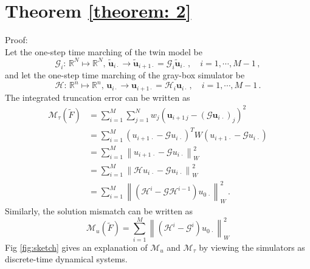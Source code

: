 \section{Theorem \ref{theorem: 2}}
\label{proof 2}
Proof: \\
Let the one-step time marching of the twin model be
\begin{equation*}
    \mathcal{G}_i:\, \mathbb{R}^N\mapsto\mathbb{R}^N,\, \tilde{\boldsymbol{u}}_{i\cdot}\rightarrow 
    \tilde{\boldsymbol{u}}_{i+1\cdot}=\mathcal{G}_i
    \tilde{\boldsymbol{u}}_{i\cdot} \,,\quad i=1,\cdots, M-1\,,
\end{equation*}
and let the one-step time marching of the gray-box simulator be
\begin{equation*}
    \mathcal{H}:\, \mathbb{R}^n\mapsto\mathbb{R}^n,\, 
    \boldsymbol{u}_{i\cdot}
    \rightarrow 
    \boldsymbol{u}_{i+1\cdot} = \mathcal{H}_i\boldsymbol{u}_{i\cdot} \,,
    \quad i=1,\cdots, M-1\,.
\end{equation*}
The integrated truncation error can be written as
\begin{equation*}\begin{split}
    \mathcal{M}_{\tau}(\tilde{F}) &= 
        \sum_{i=1}^M \sum_{j=1}^N w_{j} \left(
        \boldsymbol{u}_{i+1\, j} - (\mathcal{G}\boldsymbol{u}_{i\, \cdot})_j
        \right)^2\\
    &= \sum_{i=1}^M (u_{i+1\,\cdot} - \mathcal{G} u_{i\,\cdot})^T W
                    (u_{i+1\,\cdot} - \mathcal{G} u_{i\,\cdot}) \\
    &= \sum_{i=1}^M \left\|u_{i+1\,\cdot} - \mathcal{G} u_{i\,\cdot}\right\|^2_{W}\\
    &= \sum_{i=1}^M \left\| \mathcal{H} u_{i\, \cdot} - \mathcal{G} u_{i\,\cdot} \right\|^2_{W}\\
    &= \sum_{i=1}^M \left\| \left(\mathcal{H}^i - \mathcal{G} \mathcal{H}^{i-1}\right)
       u_{0\,\cdot} \right\|^2_{W}\,.
\end{split}\end{equation*}
Similarly, the solution mismatch can be written as
\begin{equation*}
    \mathcal{M}_u(\tilde{F}) = \sum_{i=1}^M \left\| 
    \left(\mathcal{H}^i - \mathcal{G}^i\right)
    u_{0\,\cdot} \right\|^2_{W}
\end{equation*}
Fig \ref{fig:sketch} gives an explanation of $\mathcal{M}_u$ and $\mathcal{M}_{\tau}$ by viewing 
the simulators as discrete-time dynamical systems.\\

